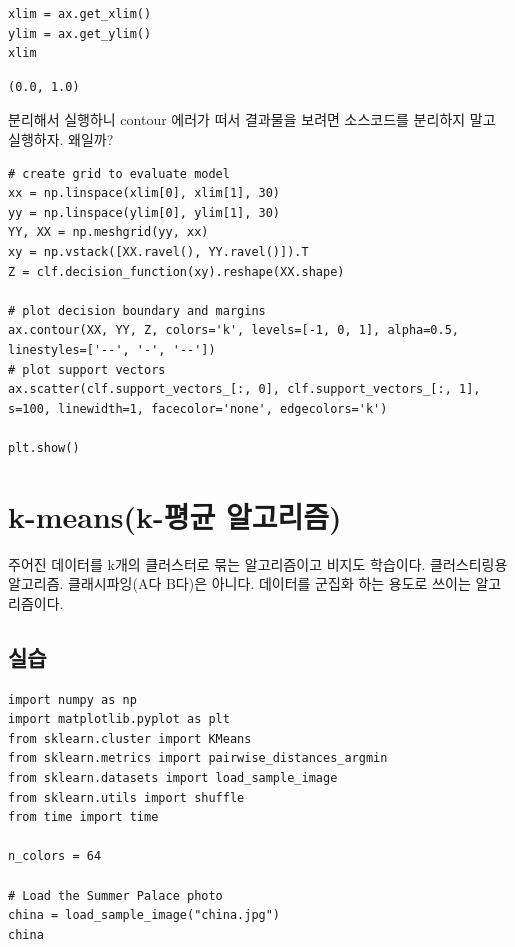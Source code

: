 \documentclass[11pt]{article}
\begin{document}
\begin{verbatim}
xlim = ax.get_xlim()
ylim = ax.get_ylim()
xlim
\end{verbatim}

\begin{verbatim}
(0.0, 1.0)
\end{verbatim}
분리해서 실행하니 contour 에러가 떠서 결과물을 보려면 소스코드를 분리하지 말고 실행하자. 왜일까?
\begin{verbatim}
# create grid to evaluate model
xx = np.linspace(xlim[0], xlim[1], 30)
yy = np.linspace(ylim[0], ylim[1], 30)
YY, XX = np.meshgrid(yy, xx)
xy = np.vstack([XX.ravel(), YY.ravel()]).T
Z = clf.decision_function(xy).reshape(XX.shape)

# plot decision boundary and margins
ax.contour(XX, YY, Z, colors='k', levels=[-1, 0, 1], alpha=0.5, linestyles=['--', '-', '--'])
# plot support vectors
ax.scatter(clf.support_vectors_[:, 0], clf.support_vectors_[:, 1], s=100, linewidth=1, facecolor='none', edgecolors='k')

plt.show()

\end{verbatim}

\section{k-means(k-평균 알고리즘)}
\label{sec:orgbfa4e22}
주어진 데이터를 k개의 클러스터로 묶는 알고리즘이고 비지도 학습이다. 클러스티링용 알고리즘. 클래시파잉(A다 B다)은 아니다. 데이터를 군집화 하는 용도로 쓰이는 알고리즘이다.

\subsection{실습}
\label{sec:org4687527}
\begin{verbatim}
import numpy as np
import matplotlib.pyplot as plt
from sklearn.cluster import KMeans
from sklearn.metrics import pairwise_distances_argmin
from sklearn.datasets import load_sample_image
from sklearn.utils import shuffle
from time import time

n_colors = 64

# Load the Summer Palace photo
china = load_sample_image("china.jpg")
china
\end{verbatim}
\end{document}
